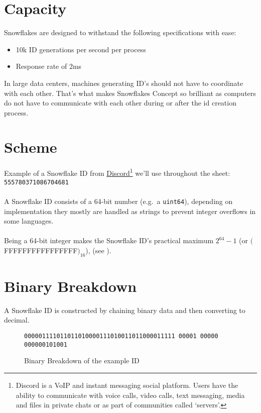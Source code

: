 \documentclass{article}
\newcommand{\code}[1]{\colorbox{cverbbg}{\texttt{#1}}}
\newcommand{\hn}[0]{\hfill \\}
\begin{document}
\section{Capacity}
Snowflakes are designed to withstand the following specifications with ease:
\begin{itemize}
    \item 10k ID generations per second per process
    \item Response rate of 2ms
\end{itemize}
In large data centers, machines generating ID's should not have to coordinate
with each other. That's what makes Snowflakes Concept so brilliant as computers
do not have to communicate with each other during or after the id creation
process.

\section{Scheme}
Example of a Snowflake ID from
\href{https://discord.com/}{Discord}\footnote{Discord is a VoIP and instant
    messaging social platform. Users have the ability to communicate with voice
    calls, video calls, text messaging, media and files in private chats or as
    part
    of communities called `servers'.} we'll use throughout the sheet:
\code{555780371086704681} \\
\hn{}
A Snowflake ID consists of a 64-bit number (e.g.\ a \code{uint64}), depending
on
implementation they mostly are handled as strings to prevent integer overflows
in some languages. \\
\hn{}
Being a 64-bit integer makes the Snowflake ID's practical maximum
$2^{64} - 1$ (or $($FFFFFFFFFFFFFFFF$)_{16}$),
(see ).

\section{Binary Breakdown}
A Snowflake ID is constructed by chaining binary data and then converting to
decimal. \\

\begin{figure}[H]
    \large{\texttt{\color{cyan}000001111011011010000111010011011000011111
            \color{red}00001 \color{green}00000 \color{gray}000000101001}}
    \\
    \caption{Binary Breakdown of the example ID}\label{fig:breakdown_example}
\end{figure}
\end{document}
